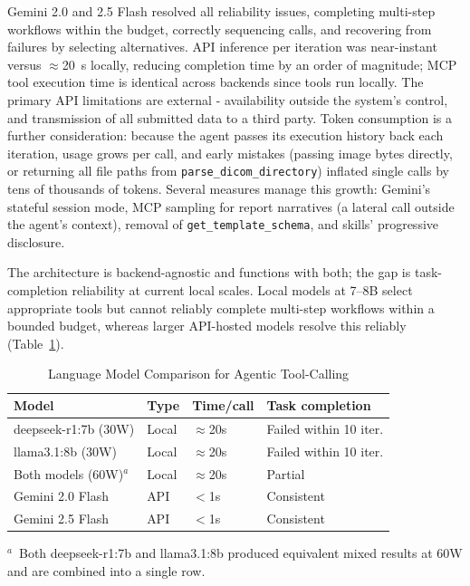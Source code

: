 \documentclass[preprint,12pt]{elsarticle}
\begin{document}
Gemini 2.0 and 2.5 Flash resolved all reliability issues, completing multi-step workflows within the budget, correctly sequencing calls, and recovering from failures by selecting alternatives. API inference per iteration was near-instant versus $\approx$20~s locally, reducing completion time by an order of magnitude; MCP tool execution time is identical across backends since tools run locally. The primary API limitations are external - availability outside the system's control, and transmission of all submitted data to a third party. Token consumption is a further consideration: because the agent passes its execution history back each iteration, usage grows per call, and early mistakes (passing image bytes directly, or returning all file paths from \texttt{parse\_dicom\_directory}) inflated single calls by tens of thousands of tokens. Several measures manage this growth: Gemini's stateful session mode, MCP sampling for report narratives (a lateral call outside the agent's context), removal of \texttt{get\_template\_schema}, and skills' progressive disclosure.

The architecture is backend-agnostic and functions with both; the gap is task-completion reliability at current local scales. Local models at 7--8B select appropriate tools but cannot reliably complete multi-step workflows within a bounded budget, whereas larger API-hosted models resolve this reliably (Table~\ref{tab:model-comparison}).

\begin{table}[H]
  \caption{Language Model Comparison for Agentic Tool-Calling}
  \label{tab:model-comparison}
  \centering
  \begin{tabular}{llll}
    \toprule
    Model & Type & Time/call & Task completion \\
    \midrule
    deepseek-r1:7b (30W) & Local & $\approx$20s & Failed within 10 iter. \\
    llama3.1:8b (30W)    & Local & $\approx$20s & Failed within 10 iter. \\
    Both models (60W)$^{a}$ & Local & $\approx$20s & Partial \\
    Gemini 2.0 Flash     & API   & $<$1s        & Consistent \\
    Gemini 2.5 Flash     & API   & $<$1s        & Consistent \\
    \bottomrule
  \end{tabular}
  \par\smallskip
  \raggedright\footnotesize
  $^{a}$~Both deepseek-r1:7b and llama3.1:8b produced equivalent mixed results at 60W and are combined into a single row.
\end{table}
\end{document}
